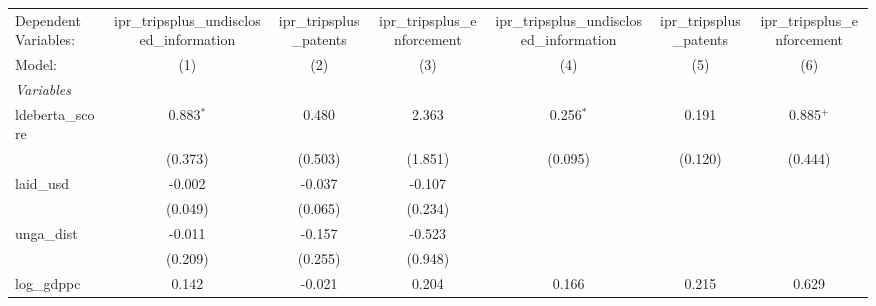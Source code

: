 
\begingroup
\centering
\begin{tabular}{lcccccc}
   \tabularnewline \midrule \midrule
   Dependent Variables:                   & ipr\_tripsplus\_undisclosed\_information    & ipr\_tripsplus\_patents   & ipr\_tripsplus\_enforcement   & ipr\_tripsplus\_undisclosed\_information    & ipr\_tripsplus\_patents   & ipr\_tripsplus\_enforcement\\    
   Model:                                 & (1)                                         & (2)                       & (3)                           & (4)                                         & (5)                       & (6)\\  
   \midrule
   \emph{Variables}\\
   ldeberta\_score                        & 0.883$^{*}$                                 & 0.480                     & 2.363                         & 0.256$^{*}$                                 & 0.191                     & 0.885$^{+}$\\   
                                          & (0.373)                                     & (0.503)                   & (1.851)                       & (0.095)                                     & (0.120)                   & (0.444)\\   
   laid\_usd                              & -0.002                                      & -0.037                    & -0.107                        &                                             &                           &   \\   
                                          & (0.049)                                     & (0.065)                   & (0.234)                       &                                             &                           &   \\   
   unga\_dist                             & -0.011                                      & -0.157                    & -0.523                        &                                             &                           &   \\   
                                          & (0.209)                                     & (0.255)                   & (0.948)                       &                                             &                           &   \\   
   log\_gdppc                             & 0.142                                       & -0.021                    & 0.204                         & 0.166                                       & 0.215                     & 0.629\\   

\end{tabular}

